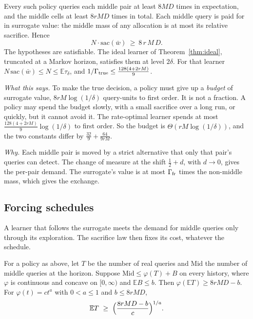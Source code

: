 \begin{theorem}
\label{thm:sacrifice}
Every such policy queries each middle pair at least $8MD$ times in expectation, and the middle
cells at least $8rMD$ times in total. Each middle query is paid for in surrogate value: the
middle mass of any allocation is at most its relative sacrifice. Hence
\[
N\cdot\mathrm{sac}(\bar w)\ \ge\ 8\,r\,M\,D .
\]
The hypotheses are satisfiable. The ideal learner of Theorem~\ref{thm:ideal}, truncated at a
Markov horizon, satisfies them at level $2\delta$. For that learner
$N\,\mathrm{sac}(\bar w)\le N\le\mathbb{E}\tau_{\delta}$, and
$1/\Gamma_{\rm true}\le\frac{128(4+2rM)}{9}$.
\end{theorem}


\emph{What this says.} To make the true decision, a policy must give up a \emph{budget} of
surrogate value, $8rM\log(1/\delta)$ query-units to first order. It is not a fraction. A policy
may spend the budget slowly, with a small sacrifice over a long run, or quickly, but it cannot
avoid it. The rate-optimal learner spends at most $\frac{128(4+2rM)}{9}\log(1/\delta)$ to first
order. So the budget is $\Theta(rM\log(1/\delta))$, and the two constants differ by
$\frac{32}{9}+\frac{64}{9rM}$.

\emph{Why.} Each middle pair is moved by a strict alternative that only that pair's queries can
detect. The change of measure at the shift $\frac12+d$, with $d\to0$, gives the per-pair demand.
The surrogate's value is at most $\Gamma_{\rm fr}$ times the non-middle mass, which gives the
exchange.

\subsection{Forcing schedules}

A learner that follows the surrogate meets the demand for middle queries only through its
exploration. The sacrifice law then fixes its cost, whatever the schedule.

\begin{theorem}
\label{thm:forcing}
For a policy as above, let $T$ be the number of real queries and $\mathrm{Mid}$ the number of
middle queries at the horizon. Suppose $\mathrm{Mid}\le\varphi(T)+B$ on every history, where
$\varphi$ is continuous and concave on $[0,\infty)$ and $\mathbb{E}B\le b$. Then
$\varphi(\mathbb{E}T)\ge8rMD-b$. For $\varphi(t)=ct^{a}$ with $0<a\le1$ and
$b\le 8rMD$,
\[
\mathbb{E}T\ \ge\ \Bigl(\frac{8rMD-b}{c}\Bigr)^{1/a}.
\]
\end{theorem}

